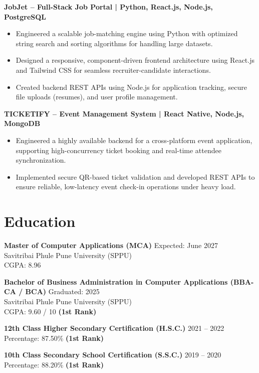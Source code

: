 \documentclass[a4paper,10pt]{article}
\begin{document}
\textbf{JobJet -- Full-Stack Job Portal | Python, React.js, Node.js, PostgreSQL}

\begin{itemize}[leftmargin=*]
    \item Engineered a scalable job-matching engine using Python with optimized string search and sorting algorithms for handling large datasets.
    \item Designed a responsive, component-driven frontend architecture using React.js and Tailwind CSS for seamless recruiter-candidate interactions.
    \item Created backend REST APIs using Node.js for application tracking, secure file uploads (resumes), and user profile management.
\end{itemize}

\textbf{TICKETIFY -- Event Management System | React Native, Node.js, MongoDB}

\begin{itemize}[leftmargin=*]
    \item Engineered a highly available backend for a cross-platform event application, supporting high-concurrency ticket booking and real-time attendee synchronization.
    \item Implemented secure QR-based ticket validation and developed REST APIs to ensure reliable, low-latency event check-in operations under heavy load.
\end{itemize}

\section*{Education}

\textbf{Master of Computer Applications (MCA)} \hfill Expected: June 2027\\
Savitribai Phule Pune University (SPPU)\\
CGPA: 8.96 

\vspace{4pt} 

\textbf{Bachelor of Business Administration in Computer Applications (BBA-CA / BCA)} \hfill Graduated: 2025\\
Savitribai Phule Pune University (SPPU)\\
CGPA: 9.60 / 10 \quad \textbf{(1st Rank)}

\vspace{4pt} 

\textbf{12th Class Higher Secondary Certification (H.S.C.)} \hfill 2021 -- 2022\\
Percentage: 87.50\% \quad \textbf{(1st Rank)}

\vspace{4pt} 

\textbf{10th Class Secondary School Certification (S.S.C.)} \hfill 2019 -- 2020\\
Percentage: 88.20\% \quad \textbf{(1st Rank)}
\end{document}
